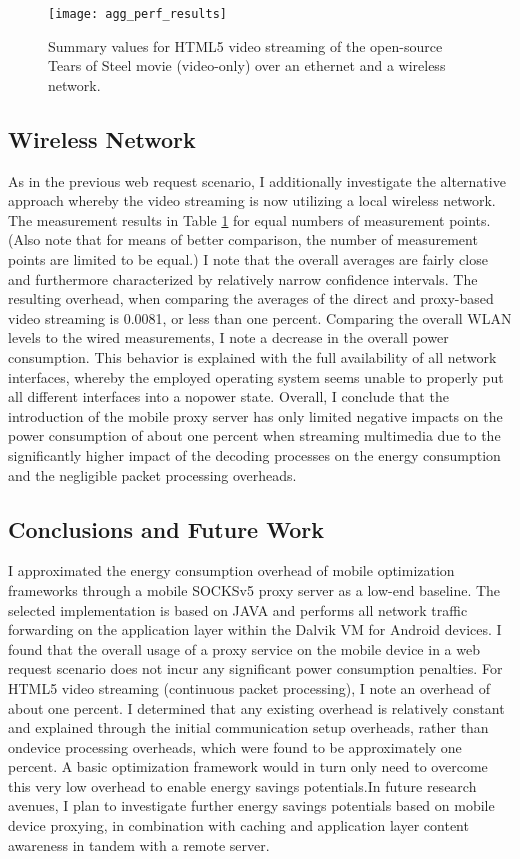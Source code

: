 \begin{figure}
\centering
\texttt{[image: agg\_perf\_results]}
\caption{Summary values for HTML5 video streaming of the open-source Tears of Steel movie (video-only) over an ethernet and a wireless network.}
\label{tab:agg_perf_results}
\end{figure}

\subsection*{Wireless Network}
As in the previous web request scenario, I additionally
investigate the alternative approach whereby the video streaming
is now utilizing a local wireless network.  The
measurement results in Table \ref{tab:agg_perf_results} for equal numbers of measurement
points. (Also note that for means of better comparison,
the number of measurement points are limited to be equal.) I
note that the overall averages are fairly close and furthermore
characterized by relatively narrow confidence intervals. The
resulting overhead, when comparing the averages of the direct
and proxy-based video streaming is 0.0081, or less than one
percent. Comparing the overall WLAN levels to the wired
measurements, I note a decrease in the overall power consumption.
This behavior is explained with the full availability of
all network interfaces, whereby the employed operating system
seems unable to properly put all different interfaces into a nopower
state.
Overall, I conclude that the introduction of the mobile
proxy server has only limited negative impacts on the power
consumption of about one percent when streaming multimedia
due to the significantly higher impact of the decoding processes
on the energy consumption and the negligible packet
processing overheads.



\subsection*{Conclusions and Future Work}
I approximated the energy consumption overhead of
mobile optimization frameworks through a mobile SOCKSv5
proxy server as a low-end baseline. The selected implementation
is based on JAVA and performs all network traffic
forwarding on the application layer within the Dalvik VM for
Android devices. I found that the overall usage of a proxy
service on the mobile device in a web request scenario does
not incur any significant power consumption penalties. For
HTML5 video streaming (continuous packet processing), I
note an overhead of about one percent. I determined that any
existing overhead is relatively constant and explained through
the initial communication setup overheads, rather than ondevice
processing overheads, which were found to be approximately one
percent. A basic optimization framework would in turn only
need to overcome this very low overhead to enable energy
savings potentials.In future research avenues, I plan to investigate further energy savings potentials based on mobile device proxying,
in combination with caching and application layer content
awareness in tandem with a remote server.